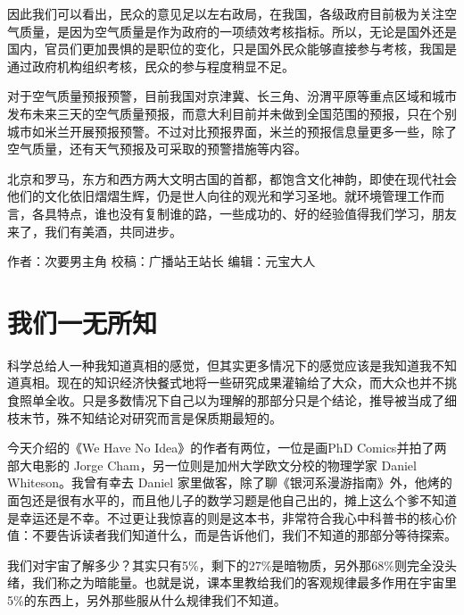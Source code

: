 \documentclass[]{book}
\begin{document}
因此我们可以看出，民众的意见足以左右政局，在我国，各级政府目前极为关注空气质量，是因为空气质量是作为政府的一项绩效考核指标。所以，无论是国外还是国内，官员们更加畏惧的是职位的变化，只是国外民众能够直接参与考核，我国是通过政府机构组织考核，民众的参与程度稍显不足。

对于空气质量预报预警，目前我国对京津冀、长三角、汾渭平原等重点区域和城市发布未来三天的空气质量预报，而意大利目前并未做到全国范围的预报，只在个别城市如米兰开展预报预警。不过对比预报界面，米兰的预报信息量更多一些，除了空气质量，还有天气预报及可采取的预警措施等内容。

北京和罗马，东方和西方两大文明古国的首都，都饱含文化神韵，即使在现代社会他们的文化依旧熠熠生辉，仍是世人向往的观光和学习圣地。就环境管理工作而言，各具特点，谁也没有复制谁的路，一些成功的、好的经验值得我们学习，朋友来了，我们有美酒，共同进步。

作者：次要男主角
校稿：广播站王站长
编辑：元宝大人

\hypertarget{ux6211ux4eecux4e00ux65e0ux6240ux77e5}{%
\section{我们一无所知}\label{ux6211ux4eecux4e00ux65e0ux6240ux77e5}}

科学总给人一种我知道真相的感觉，但其实更多情况下的感觉应该是我知道我不知道真相。现在的知识经济快餐式地将一些研究成果灌输给了大众，而大众也并不挑食照单全收。只是多数情况下自己以为理解的那部分只是个结论，推导被当成了细枝末节，殊不知结论对研究而言是保质期最短的。

今天介绍的《We Have No Idea》的作者有两位，一位是画PhD Comics并拍了两部大电影的 Jorge Cham，另一位则是加州大学欧文分校的物理学家 Daniel Whiteson。我曾有幸去 Daniel 家里做客，除了聊《银河系漫游指南》外，他烤的面包还是很有水平的，而且他儿子的数学习题是他自己出的，摊上这么个爹不知道是幸运还是不幸。不过更让我惊喜的则是这本书，非常符合我心中科普书的核心价值：不要告诉读者我们知道什么，而是告诉他们，我们不知道的那部分等待探索。

我们对宇宙了解多少？其实只有5\%，剩下的27\%是暗物质，另外那68\%则完全没头绪，我们称之为暗能量。也就是说，课本里教给我们的客观规律最多作用在宇宙里5\%的东西上，另外那些服从什么规律我们不知道。
\end{document}
